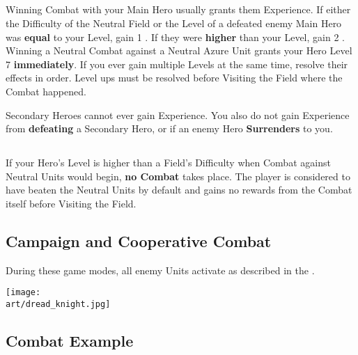 \begin{multicols}{2}
\subsection*{}

Winning Combat with your Main Hero usually grants them Experience.
If either the Difficulty of the Neutral Field or the Level of a defeated enemy Main Hero was \textbf{equal} to your Level, gain 1 .
If they were \textbf{higher} than your Level, gain 2 .
Winning a Neutral Combat against a Neutral Azure  Unit grants your Hero Level 7 \textbf{immediately}.
If you ever gain multiple Levels at the same time, resolve their effects in order.
Level ups must be resolved before Visiting the Field where the Combat happened.\par
Secondary Heroes cannot ever gain Experience.
You also do not gain Experience from \textbf{defeating} a Secondary Hero, or if an enemy Hero \textbf{Surrenders} to you.

\subsection*{}
If your Hero's Level is higher than a Field's Difficulty when Combat against Neutral Units would begin, \textbf{no Combat} takes place.
The player is considered to have beaten the Neutral Units by default and gains no rewards from the Combat itself before Visiting the Field.

\subsection*{Campaign and Cooperative Combat}
During these game modes, all enemy Units activate as described in the .

\end{multicols}

\vspace*{\fill}
{
  \centering
  \texttt{[image: \\art/dread\_knight.jpg]}
}

\clearpage

\subsection*{Combat Example}

